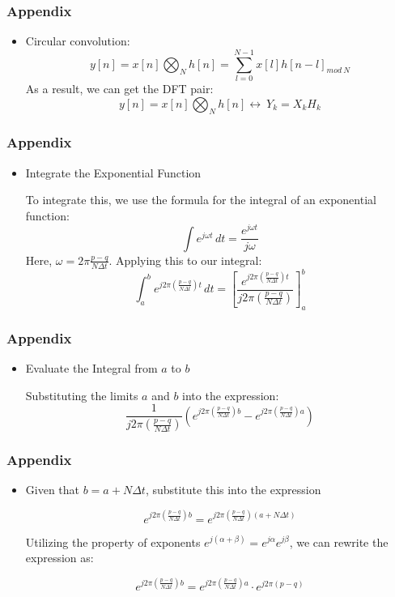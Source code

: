 \documentclass[xcolor=dvipsnames]{beamer} %
\begin{document}
\begin{frame}
\frametitle{Appendix}
\begin{itemize}
  \item Circular convolution:
  \[y[n] = x[n]\bigotimes_{N}h[n] = \sum_{l=0}^{N-1}x[l]h[n-l]_{mod\ N}\]
  As a result, we can get the DFT pair:
  \[y[n]=x[n]\bigotimes_{N}h[n] \leftrightarrow\ Y_{k}=X_{k}H_{k}\] 
\end{itemize}
\end{frame}
\begin{frame}
\frametitle{Appendix}
\begin{itemize}
  \item Integrate the Exponential Function
  
  To integrate this, we use the formula for the integral of an exponential function:   
    \[
    \int e^{j\omega t} \, dt = \frac{e^{j\omega t}}{j\omega}
    \]
    Here, \(\omega = 2\pi \frac{p - q}{N\Delta t}\). Applying this to our integral:
    \[
    \int_a^b e^{j2\pi(\frac{p - q}{N\Delta t})t} \, dt = \left[ \frac{e^{j2\pi(\frac{p - q}{N\Delta t})t}}{j2\pi(\frac{p - q}{N\Delta t})} \right]_a^b
    \]
 
\end{itemize}
\end{frame}
\begin{frame}
\frametitle{Appendix}
\begin{itemize}
  \item Evaluate the Integral from \(a\) to \(b\)
  
  Substituting the limits \(a\) and \(b\) into the expression:
    \[
    \frac{1}{j2\pi(\frac{p - q}{N\Delta t})} \left( e^{j2\pi(\frac{p - q}{N\Delta t})b} - e^{j2\pi(\frac{p - q}{N\Delta t})a} \right)
    \]
\end{itemize}
\end{frame}
\begin{frame}
\frametitle{Appendix}
\begin{itemize}
  \item Given that \(b = a + N\Delta t\), substitute this into the expression
  
   \[
    e^{j2\pi \left( \frac{p-q}{N\Delta t} \right) b} = e^{j2\pi \left( \frac{p-q}{N\Delta t} \right) (a + N\Delta t)}
    \]

     Utilizing the property of exponents \(e^{j(\alpha + \beta)} = e^{j\alpha} e^{j\beta}\), we can rewrite the expression as:

     \[
    e^{j2\pi \left( \frac{p-q}{N\Delta t} \right) b} = e^{j2\pi \left( \frac{p-q}{N\Delta t} \right) a} \cdot e^{j2\pi (p-q)}
    \]

\end{itemize}
\end{frame}
\end{document}
